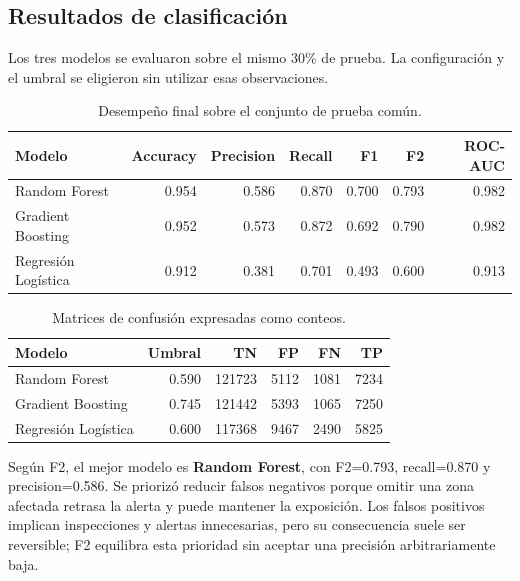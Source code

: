 \subsection{Resultados de clasificación}
Los tres modelos se evaluaron sobre el mismo 30\% de prueba. La configuración y el umbral se eligieron sin utilizar esas observaciones.
\begin{table}[H]
\centering
\small
\begin{tabular}{lrrrrrr}
\toprule
Modelo & Accuracy & Precision & Recall & F1 & F2 & ROC-AUC \\
\midrule
Random Forest & 0.954 & 0.586 & 0.870 & 0.700 & 0.793 & 0.982 \\
Gradient Boosting & 0.952 & 0.573 & 0.872 & 0.692 & 0.790 & 0.982 \\
Regresión Logística & 0.912 & 0.381 & 0.701 & 0.493 & 0.600 & 0.913 \\
\bottomrule
\end{tabular}
\caption{Desempeño final sobre el conjunto de prueba común.}
\end{table}
\begin{table}[H]
\centering
\small
\begin{tabular}{lrrrrr}
\toprule
Modelo & Umbral & TN & FP & FN & TP \\
\midrule
Random Forest & 0.590 & 121723 & 5112 & 1081 & 7234 \\
Gradient Boosting & 0.745 & 121442 & 5393 & 1065 & 7250 \\
Regresión Logística & 0.600 & 117368 & 9467 & 2490 & 5825 \\
\bottomrule
\end{tabular}
\caption{Matrices de confusión expresadas como conteos.}
\end{table}
Según F2, el mejor modelo es \textbf{Random Forest}, con F2=0.793, recall=0.870 y precision=0.586.
Se priorizó reducir falsos negativos porque omitir una zona afectada retrasa la alerta y puede mantener la exposición. Los falsos positivos implican inspecciones y alertas innecesarias, pero su consecuencia suele ser reversible; F2 equilibra esta prioridad sin aceptar una precisión arbitrariamente baja.
